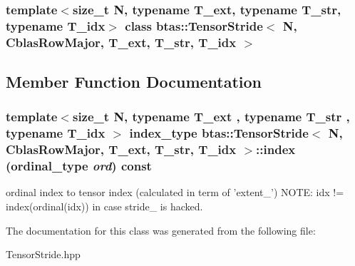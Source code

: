 \subsubsection*{template$<$size\_\-t N, typename T\_\-ext, typename T\_\-str, typename T\_\-idx$>$ class btas::TensorStride$<$ N, CblasRowMajor, T\_\-ext, T\_\-str, T\_\-idx $>$}



\subsection{Member Function Documentation}
\hypertarget{classbtas_1_1_tensor_stride_3_01_n_00_01_cblas_row_major_00_01_t__ext_00_01_t__str_00_01_t__idx_01_4_a5f38213dbaba5c46ce528337ca77ce03}{
\subsubsection[{index}]{\setlength{\rightskip}{0pt plus 5cm}template$<$size\_\-t N, typename T\_\-ext , typename T\_\-str , typename T\_\-idx $>$ index\_\-type btas::TensorStride$<$ N, CblasRowMajor, T\_\-ext, T\_\-str, T\_\-idx $>$::index (ordinal\_\-type {\em ord}) const}}
\label{classbtas_1_1_tensor_stride_3_01_n_00_01_cblas_row_major_00_01_t__ext_00_01_t__str_00_01_t__idx_01_4_a5f38213dbaba5c46ce528337ca77ce03}
ordinal index to tensor index (calculated in term of 'extent\_\-') NOTE: idx != index(ordinal(idx)) in case stride\_\- is hacked. 

The documentation for this class was generated from the following file:\begin{DoxyCompactItemize}
\item 
TensorStride.hpp\end{DoxyCompactItemize}
